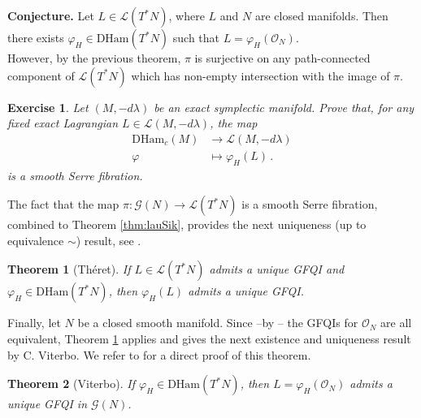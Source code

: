 \documentclass{article}
\newcommand{\1}{\mathbbm{1}}
\newtheorem{thm}{Theorem}[section]
\newtheorem{exo}{Exercise}
\theoremstyle{remark}
\begin{document}
{{\noindent \textbf{Conjecture.} Let $L \in \mathscr{L}(T^*N)$, where $L$ and $N$
are closed manifolds. Then there exists $\varphi_H \in \mathrm{DHam}(T^*N)$ such that $L = \varphi_H(\mathcal{O}_N)$. \\

\noindent However, by the previous theorem, $\pi$ is surjective on any path-connected component of $\mathscr{L}(T^*N) $ which has non-empty intersection with the image of $\pi$.
\begin{exo} \textnormal{Let $(M,-d\lambda)$ be an exact symplectic manifold. Prove that, for any fixed exact Lagrangian $L \in \mathscr{L}(M,-d\lambda)$, the map 
\begin{equation*}
\begin{split}
\mathrm{DHam}_c(M) & \rightarrow \mathscr{L}(M,-d\lambda) \\
\varphi & \mapsto \varphi_H(L)\, .
\end{split}
\end{equation*}
is a smooth Serre fibration.}
\end{exo}
\noindent The fact that the map $\pi: \mathscr{G}(N) \rightarrow \mathscr{L}(T^*N)$ is a smooth Serre fibration, combined to Theorem \ref{thm:lauSik}, provides the next uniqueness (up to equivalence $\sim$) result, see \cite[Theorem 5.1]{the99}.
\begin{thm}[Théret] \label{theret2}
If $L \in \mathscr{L}(T^*N)$ admits a unique GFQI and $\varphi_H \in \mathrm{DHam}(T^*N)$, then $\varphi_H(L)$ admits a unique GFQI.  
\end{thm}
\noindent Finally, let $N$ be a closed smooth manifold. Since --by \cite[Lemma 6.2]{the99}-- the GFQIs for $\mathcal{O}_N$ are all equivalent, Theorem \ref{theret2} applies and gives the next existence and uniqueness result by C. Viterbo. We refer to \cite[Proposition 1.5]{vit92} for a direct proof of this theorem.
\begin{thm}[Viterbo] \label{Vit 92}
If $\varphi_H \in \mathrm{DHam}(T^*N)$, then $L = \varphi_H(\mathcal{O}_N)$ admits a unique GFQI in $\mathscr{G}(N)$.  
\end{thm}

}}
\end{document}
